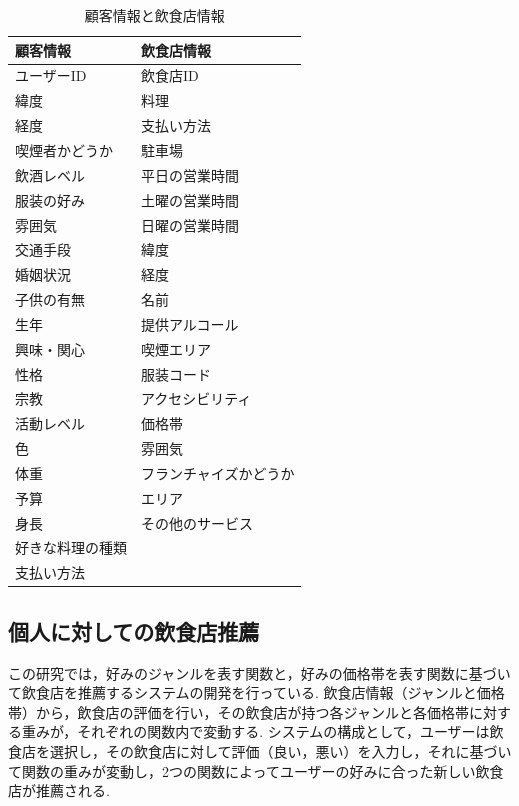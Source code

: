 \documentclass[12pt,a4j]{jreport}
\begin{document}
\begin{table}[htbp]
  \begin{center}
    \begin{tabular}{|l|l|}\hline
      \textbf{顧客情報} & \textbf{飲食店情報} \\ \hline
      ユーザーID & 飲食店ID \\
      緯度 & 料理 \\
      経度 & 支払い方法 \\
      喫煙者かどうか & 駐車場 \\
      飲酒レベル & 平日の営業時間 \\
      服装の好み & 土曜の営業時間 \\
      雰囲気 & 日曜の営業時間 \\
      交通手段 & 緯度 \\
      婚姻状況 & 経度 \\
      子供の有無 & 名前 \\
      生年 & 提供アルコール \\
      興味・関心 & 喫煙エリア \\
      性格 & 服装コード \\
      宗教 & アクセシビリティ \\
      活動レベル & 価格帯 \\
      色 & 雰囲気 \\
      体重 & フランチャイズかどうか \\
      予算 & エリア \\
      身長 & その他のサービス \\
      好きな料理の種類 &  \\
      支払い方法 &  \\ \hline
    \end{tabular}
  \end{center}
  \caption{顧客情報と飲食店情報}
  \label{master_table}
\end{table}

\subsection{個人に対しての飲食店推薦\cite{b}}
この研究では，好みのジャンルを表す関数と，好みの価格帯を表す関数に基づいて飲食店を推薦するシステムの開発を行っている.
飲食店情報（ジャンルと価格帯）から，飲食店の評価を行い，その飲食店が持つ各ジャンルと各価格帯に対する重みが，それぞれの関数内で変動する.
システムの構成として，ユーザーは飲食店を選択し，その飲食店に対して評価（良い，悪い）を入力し，それに基づいて関数の重みが変動し，2つの関数によってユーザーの好みに合った新しい飲食店が推薦される.
\end{document}
